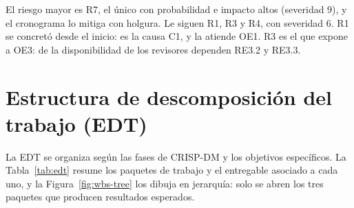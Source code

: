 El riesgo mayor es R7, el único con probabilidad e impacto altos (severidad 9),
y el cronograma lo mitiga con holgura. Le siguen R1, R3 y R4, con severidad 6.
R1 se concretó desde el inicio: es la causa C1, y la atiende OE1. R3 es el que
expone a OE3: de la disponibilidad de los revisores dependen RE3.2 y RE3.3.

\clearpage
\section{Estructura de descomposición del trabajo (EDT)}
\label{sec:edt}

La EDT se organiza según las fases de CRISP-DM y los
objetivos específicos. La Tabla~\ref{tab:edt} resume los paquetes de trabajo y
el entregable asociado a cada uno, y la Figura~\ref{fig:wbs-tree} los dibuja en
jerarquía: solo se abren los tres paquetes que producen resultados esperados.

